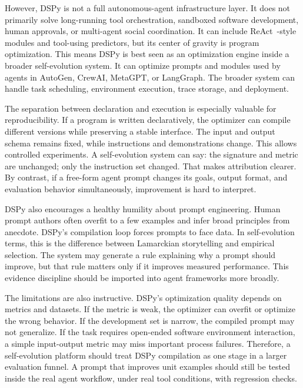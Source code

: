 However, DSPy is not a full autonomous-agent infrastructure layer.  It does not primarily solve long-running tool orchestration, sandboxed software development, human approvals, or multi-agent social coordination.  It can include ReAct~\cite{yao2023react}-style modules and tool-using predictors, but its center of gravity is program optimization.  This means DSPy is best seen as an optimization engine inside a broader self-evolution system.  It can optimize prompts and modules used by agents in AutoGen, CrewAI, MetaGPT, or LangGraph.  The broader system can handle task scheduling, environment execution, trace storage, and deployment.

The separation between declaration and execution is especially valuable for reproducibility.  If a program is written declaratively, the optimizer can compile different versions while preserving a stable interface.  The input and output schema remains fixed, while instructions and demonstrations change.  This allows controlled experiments.  A self-evolution system can say: the signature and metric are unchanged; only the instruction set changed.  That makes attribution clearer.  By contrast, if a free-form agent prompt changes its goals, output format, and evaluation behavior simultaneously, improvement is hard to interpret.

DSPy also encourages a healthy humility about prompt engineering.  Human prompt authors often overfit to a few examples and infer broad principles from anecdote.  DSPy's compilation loop forces prompts to face data.  In self-evolution terms, this is the difference between Lamarckian storytelling and empirical selection.  The system may generate a rule explaining why a prompt should improve, but that rule matters only if it improves measured performance.  This evidence discipline should be imported into agent frameworks more broadly.

The limitations are also instructive.  DSPy's optimization quality depends on metrics and datasets.  If the metric is weak, the optimizer can overfit or optimize the wrong behavior.  If the development set is narrow, the compiled prompt may not generalize.  If the task requires open-ended software environment interaction, a simple input-output metric may miss important process failures.  Therefore, a self-evolution platform should treat DSPy compilation as one stage in a larger evaluation funnel.  A prompt that improves unit examples should still be tested inside the real agent workflow, under real tool conditions, with regression checks.

